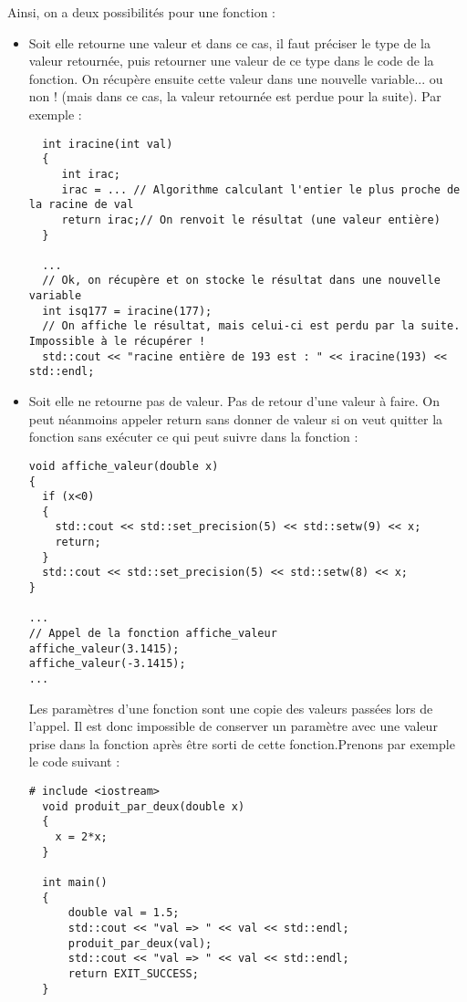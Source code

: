 Ainsi, on a deux possibilités pour une fonction :
\begin{itemize}
  \item Soit elle retourne une valeur et dans ce cas, il faut préciser le type de la valeur retournée,
  puis retourner une valeur de ce type dans le code de la fonction. On récupère ensuite cette valeur
  dans une nouvelle variable... ou non ! (mais dans ce cas, la valeur retournée est perdue pour la suite).
  Par exemple :
  \begin{lstlisting}
  int iracine(int val)
  {
     int irac;
     irac = ... // Algorithme calculant l'entier le plus proche de la racine de val
     return irac;// On renvoit le résultat (une valeur entière)
  }

  ...
  // Ok, on récupère et on stocke le résultat dans une nouvelle variable
  int isq177 = iracine(177);
  // On affiche le résultat, mais celui-ci est perdu par la suite. Impossible à le récupérer !
  std::cout << "racine entière de 193 est : " << iracine(193) << std::endl; 
  \end{lstlisting}
  \item Soit elle ne retourne pas de valeur. Pas de retour d'une valeur à faire. On peut néanmoins appeler
  return sans donner de valeur si on veut quitter la fonction sans exécuter ce qui peut suivre dans la
  fonction :
\begin{lstlisting}
void affiche_valeur(double x)
{
  if (x<0)
  {
    std::cout << std::set_precision(5) << std::setw(9) << x;
    return;
  }
  std::cout << std::set_precision(5) << std::setw(8) << x;
}

...
// Appel de la fonction affiche_valeur
affiche_valeur(3.1415);
affiche_valeur(-3.1415);
...
\end{lstlisting}

Les paramètres d'une fonction sont une copie des valeurs passées lors de l'appel. Il est
donc impossible de conserver un paramètre avec une valeur prise dans la fonction après être sorti
de cette fonction.Prenons par exemple le code suivant :

\begin{lstlisting}
# include <iostream>
  void produit_par_deux(double x)
  {
    x = 2*x;
  }

  int main()
  {
      double val = 1.5;
      std::cout << "val => " << val << std::endl;
      produit_par_deux(val);
      std::cout << "val => " << val << std::endl;
      return EXIT_SUCCESS;      
  }
\end{lstlisting}


\end{itemize}
